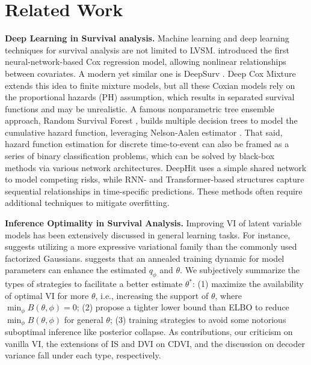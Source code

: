 \section{Related Work}
\textbf{Deep Learning in Survival analysis.} Machine learning and deep learning techniques for survival analysis are not limited to LVSM. \citet{faraggi1995neural} introduced the first neural-network-based Cox regression model, allowing nonlinear relationships between covariates. A modern yet similar one is DeepSurv \cite{katzman2018deepsurv}. Deep Cox Mixture \cite{nagpal2021dcm} extends this idea to finite mixture models, but all these Coxian models rely on the proportional hazards (PH) assumption, which results in separated survival functions \cite{antolini2005time} and may be unrealistic. A famous nonparametric tree ensemble approach, Random Survival Forest \cite{ishwaran2008random}, builds multiple decision trees to model the cumulative hazard function, leveraging Nelson-Aalen estimator \citep{aalen1978nonparametric}. That said, hazard function estimation for discrete time-to-event can also be framed as a series of binary classification problems, which can be solved by black-box methods via various network architectures. DeepHit \cite{lee2018deephit} uses a simple shared network to model competing risks, while RNN- \cite{giunchiglia2018rnn} and Transformer-based \cite{hu2021transformer} structures capture sequential relationships in time-specific predictions. These methods often require additional techniques to mitigate overfitting.

\textbf{Inference Optimality in Survival Analysis.} Improving VI of latent variable models has been extensively discussed in general learning tasks. For instance, \citet{cremer2018inference} suggests utilizing a more expressive variational family than the commonly used factorized Gaussians. \citet{fu-etal-2019-cyclical} suggests that an annealed training dynamic for model parameters can enhance the estimated $q_\phi$ and $\theta$. We subjectively summarize the types of strategies to facilitate a better estimate $\theta^*$: (1) maximize the availability of optimal VI for more $\theta$, i.e., increasing the support of $\theta$, where $\min_{\phi} B(\theta,\phi)=0$;  (2) propose a tighter lower bound than ELBO to reduce $\min_{\phi} B(\theta,\phi)$ for general $\theta$; (3) training strategies to avoid some notorious suboptimal inference like posterior collapse. %
As contributions, our criticism on vanilla VI, the extensions of IS and DVI on CDVI, and the discussion on decoder variance fall under each type, respectively.

